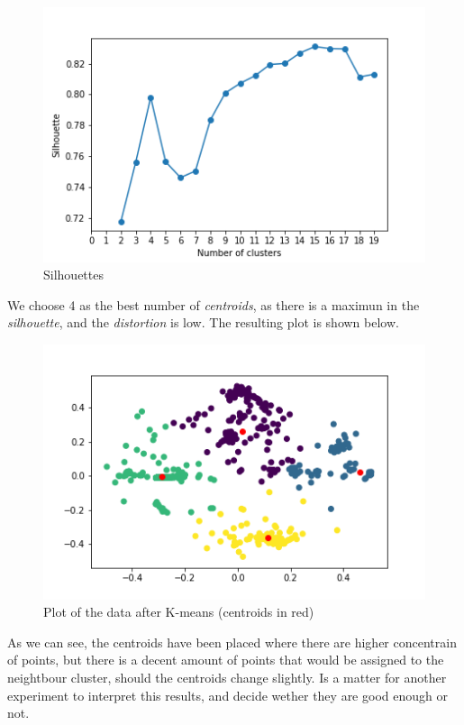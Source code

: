 \documentclass[idxtotoc,hyperref,openany]{labbook} %
\begin{document}
\begin{figure}[h]
\includegraphics[width=0.9\linewidth]{2710/KMeans_Silhouttes_Gyroscope.png}
\setlength\belowcaptionskip{-10pt}
\caption{Silhouettes}
\label{Silhouettes Gyroscope}
\end{figure}  

\clearpage

We choose 4 as the best number of \textit{centroids}, as there is a maximun in the \textit{silhouette}, and the \textit{distortion} is low. The resulting plot is shown below.

\begin{figure}[h]
\includegraphics[width=0.9\linewidth]{2710/KMeans_Plot_Gyroscope.png}
\setlength\belowcaptionskip{-10pt}
\caption{Plot of the data after K-means (centroids in red)}
\label{K-Means Gyroscope}
\end{figure}

As we can see, the centroids have been placed where there are higher concentrain of points, but there is a decent amount of points that would be assigned to the neightbour cluster, should the centroids change slightly. Is a matter for another experiment to interpret this results, and decide wether they are good enough or not.
\end{document}
